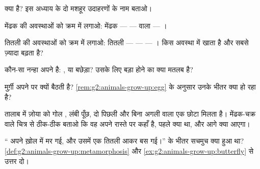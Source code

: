 \begin{exercise}[$\star$]\label{exo:g2:animals-grow-up:4}
 क्या है? इस अध्याय के दो मशहूर उदाहरणों के नाम बताओ।
\end{exercise}

\begin{exercise}[$\star$]\label{exo:g2:animals-grow-up:5}
मेंढक की अवस्थाओं को क्रम में लगाओ: मेंढक ---  ---  वाला
 --- ।
\end{exercise}

\begin{exercise}[$\star$]\label{exo:g2:animals-grow-up:6}
तितली की अवस्थाओं को क्रम में लगाओ: तितली ---  ---  ---
। किस अवस्था में   खाता है और सबसे ज़्यादा बढ़ता
है?
\end{exercise}

\begin{exercise}[$\star$]\label{exo:g2:animals-grow-up:7}
कौन-सा नन्हा  अपने  है: , या
बछेड़ा? उसके लिए बड़ा होने का क्या मतलब है?
\end{exercise}

\begin{exercise}[$\star$]\label{exo:g2:animals-grow-up:8}
मुर्ग़ी अपने  पर क्यों बैठती है?
\cref{rem:g2:animals-grow-up:egg} के अनुसार उनके भीतर क्या हो रहा है?
\end{exercise}

\begin{exercise}[$\star\star$]\label{exo:g2:animals-grow-up:9}
तालाब में ज़ोया को गोल , लंबी पूँछ, दो पिछली  और बिना अगली
 वाला एक छोटा  मिलता है। मेंढक-चक्र वाले चित्र से ठीक-ठीक
बताओ कि वह अपने रास्ते पर कहाँ है, पहले क्या था, और आगे क्या आएगा।
\end{exercise}

\begin{exercise}[$\star\star$]\label{exo:g2:animals-grow-up:10}
`` अपने ख़ोल में मर गई, और उसमें एक तितली आकर बस गई।''  के
भीतर सचमुच क्या हुआ था?
\cref{def:g2:animals-grow-up:metamorphosis} और
\cref{ex:g2:animals-grow-up:butterfly} से उत्तर दो।
\end{exercise}
